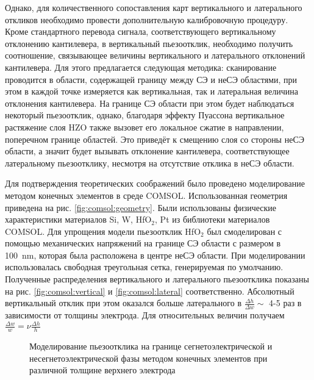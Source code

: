 Однако, для количественного сопоставления карт вертикального и латерального откликов необходимо провести дополнительную калибровочную процедуру. Кроме стандартного перевода сигнала, соответствующего вертикальному отклонению кантилевера, в вертикальный пьезоотклик, необходимо получить соотношение, связывающее величины вертикального и латерального отклонений кантилевера. Для этого предлагается следующая методика: сканирование проводится в области, содержащей границу между СЭ и неСЭ областями, при этом в каждой точке измеряется как вертикальная, так и латеральная величина отклонения кантилевера. На границе СЭ области при этом будет наблюдаться некоторый пьезоотклик, однако, благодаря эффекту Пуассона вертикальное растяжение слоя HZO также вызовет его локальное сжатие в направлении, поперечном границе областей. Это приведёт к смещению слоя со стороны неСЭ области, а значит будет вызывать отклонение кантилевера, соответствующее латеральному пьезоотклику, несмотря на отсутствие отклика в неСЭ области.

Для подтверждения теоретических соображений было проведено моделирование методом конечных элементов в среде COMSOL. Использованная геометрия приведена на рис. \cref{fig:comsol:geometry}. Были использованы физические характеристики материалов Si, W, HfO\(_2\), Pt из библиотеки материалов COMSOL. Для упрощения модели пьезоотклик HfO\(_2\) был смоделирован с помощью механических напряжений на границе СЭ области с размером в \SI{100}{\nano\meter}, которая была расположена в центре неСЭ области. При моделировании использовалась свободная треугольная сетка, генерируемая по умолчанию. Полученные распределения вертикального и латерального пьезоотклика показаны на рис. \cref{fig:comsol:vertical} и \cref{fig:comsol:lateral} соответственно. Абсолютный вертикальный отклик при этом оказался больше латерального в \(\frac{\Delta h}{\Delta w}\sim\) 4-5 раз в зависимости от толщины электрода. Для относительных величин получаем \(\frac{\Delta w}{w} = \nu \frac{\Delta h}{h}\)

\begin{figure}[ht]
    \caption[Этот текст попадает в названия рисунков в списке рисунков]{Моделирование пьезоотклика на границе сегнетоэлектрической и несегнетоэлектрической фазы методом конечных элементов при различной толщине верхнего электрода}\label{fig:comsol}
\end{figure}

